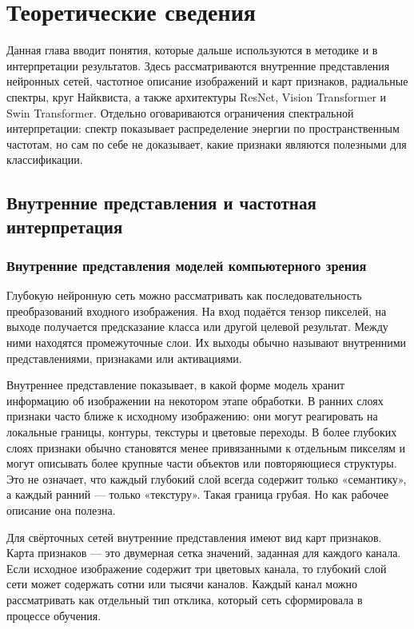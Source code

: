 \chapter{Теоретические сведения}

Данная глава вводит понятия, которые дальше используются в методике и в интерпретации результатов. Здесь рассматриваются внутренние представления нейронных сетей, частотное описание изображений и карт признаков, радиальные спектры, круг Найквиста, а также архитектуры ResNet, Vision Transformer и Swin Transformer. Отдельно оговариваются ограничения спектральной интерпретации: спектр показывает распределение энергии по пространственным частотам, но сам по себе не доказывает, какие признаки являются полезными для классификации.

\section{Внутренние представления и частотная интерпретация}

\subsection{Внутренние представления моделей компьютерного зрения}

Глубокую нейронную сеть можно рассматривать как последовательность преобразований входного изображения. На вход подаётся тензор пикселей, на выходе получается предсказание класса или другой целевой результат. Между ними находятся промежуточные слои. Их выходы обычно называют внутренними представлениями, признаками или активациями.

Внутреннее представление показывает, в какой форме модель хранит информацию об изображении на некотором этапе обработки. В ранних слоях признаки часто ближе к исходному изображению: они могут реагировать на локальные границы, контуры, текстуры и цветовые переходы. В более глубоких слоях признаки обычно становятся менее привязанными к отдельным пикселям и могут описывать более крупные части объектов или повторяющиеся структуры. Это не означает, что каждый глубокий слой всегда содержит только «семантику», а каждый ранний — только «текстуру». Такая граница грубая. Но как рабочее описание она полезна.

Для свёрточных сетей внутренние представления имеют вид карт признаков. Карта признаков — это двумерная сетка значений, заданная для каждого канала. Если исходное изображение содержит три цветовых канала, то глубокий слой сети может содержать сотни или тысячи каналов. Каждый канал можно рассматривать как отдельный тип отклика, который сеть сформировала в процессе обучения.

